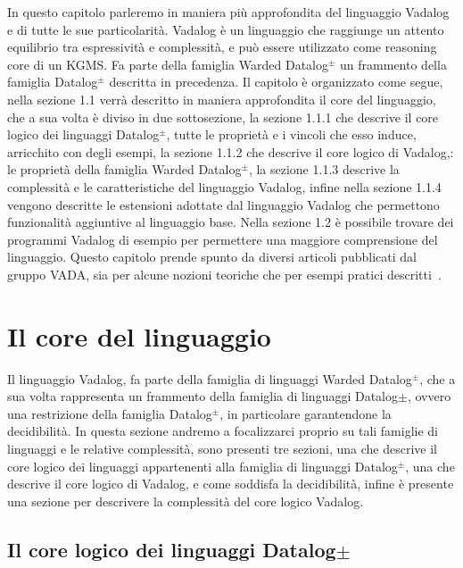 In questo capitolo parleremo in maniera più approfondita del linguaggio Vadalog e di tutte le sue particolarità. \newline
Vadalog è un linguaggio che raggiunge un attento equilibrio tra espressività e complessità, e può essere utilizzato come reasoning core di un KGMS. Fa parte della famiglia Warded Datalog$^\pm$ un frammento della famiglia Datalog$^\pm$ descritta in precedenza. \newline 
Il capitolo è organizzato come segue, nella sezione 1.1 verrà descritto in maniera approfondita il core del linguaggio, che a sua volta è diviso in due sottosezione, la sezione 1.1.1 che descrive il core logico dei linguaggi Datalog$^\pm$, tutte le proprietà e i vincoli che esso induce, arricchito con degli esempi, la sezione 1.1.2 che descrive il core logico di Vadalog,: le proprietà della famiglia Warded Datalog$^\pm$, la sezione 1.1.3 descrive la complessità e le caratteristiche del linguaggio Vadalog, infine nella sezione 1.1.4 vengono descritte le estensioni adottate dal linguaggio Vadalog che permettono funzionalità aggiuntive al linguaggio base.\newline
Nella sezione 1.2 è possibile trovare dei programmi Vadalog di esempio per permettere una maggiore comprensione del linguaggio.
Questo capitolo prende spunto da diversi articoli pubblicati dal gruppo VADA, sia per alcune nozioni teoriche che per esempi pratici descritti~\cite{bellomarini2017swift, gottlob2015beyond}.

\section{Il core del linguaggio}

Il linguaggio Vadalog, fa parte della famiglia di linguaggi Warded Datalog$^\pm$, che a sua volta rappresenta un frammento della famiglia di linguaggi Datalog$\pm$, ovvero una restrizione della famiglia Datalog$^\pm$, in particolare garantendone la decidibilità. \newline
In questa sezione andremo a focalizzarci proprio su tali famiglie di linguaggi e le relative complessità, sono presenti tre sezioni, una che descrive il core logico dei linguaggi appartenenti alla famiglia di linguaggi Datalog$^\pm$, una che descrive il core logico di Vadalog, e come soddisfa la decidibilità, infine è presente una sezione per descrivere la complessità del core logico Vadalog.

\subsection{Il core logico dei linguaggi Datalog$\pm$}

